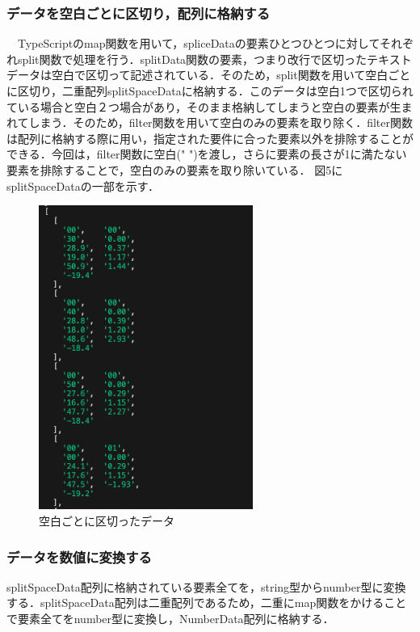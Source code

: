  \subsubsection{データを空白ごとに区切り，配列に格納する}
　TypeScriptのmap関数を用いて，spliceDataの要素ひとつひとつに対してそれぞれsplit関数で処理を行う．splitData関数の要素，つまり改行で区切ったテキストデータは空白で区切って記述されている．そのため，split関数を用いて空白ごとに区切り，二重配列splitSpaceDataに格納する．このデータは空白1つで区切られている場合と空白２つ場合があり，そのまま格納してしまうと空白の要素が生まれてしまう．そのため，filter関数を用いて空白のみの要素を取り除く．filter関数は配列に格納する際に用い，指定された要件に合った要素以外を排除することができる．今回は，filter関数に空白(" ")を渡し，さらに要素の長さが1に満たない要素を排除することで，空白のみの要素を取り除いている．
 図5にsplitSpaceDataの一部を示す．
 \begin{figure}[h]
   \centering
   \includegraphics[width=70mm]{fig/splitSpaceData.png}
   \caption{空白ごとに区切ったデータ}
 \end{figure}
 
 \subsubsection{データを数値に変換する}
 splitSpaceData配列に格納されている要素全てを，string型からnumber型に変換する．splitSpaceData配列は二重配列であるため，二重にmap関数をかけることで要素全てをnumber型に変換し，NumberData配列に格納する．
 
